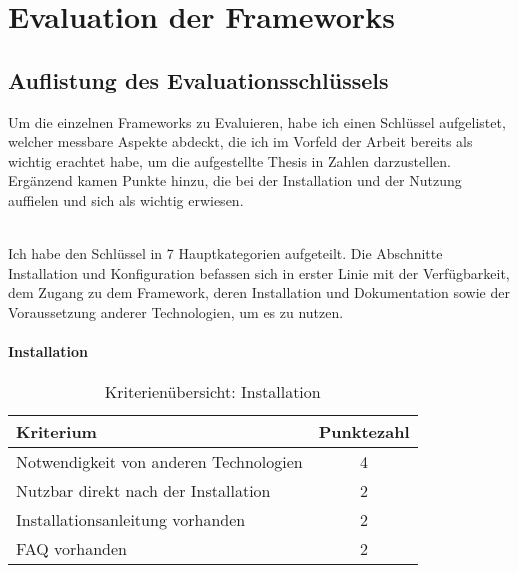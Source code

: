 \chapter{Evaluation der Frameworks}
\section{Auflistung des Evaluationsschlüssels}

Um die einzelnen Frameworks zu Evaluieren, habe ich einen Schlüssel aufgelistet, welcher messbare Aspekte abdeckt, die ich im Vorfeld der Arbeit bereits als wichtig erachtet habe, um die aufgestellte Thesis in Zahlen darzustellen. Ergänzend kamen Punkte hinzu, die bei der Installation und der Nutzung auffielen und sich als wichtig erwiesen. 

\\Ich habe den Schlüssel in 7 Hauptkategorien aufgeteilt. Die Abschnitte Installation und Konfiguration befassen sich in erster Linie mit der Verfügbarkeit, dem Zugang zu dem Framework, deren Installation und Dokumentation sowie der Voraussetzung anderer Technologien, um es zu nutzen.

\subsubsection{Installation}
\begin{table}[H]
 	\vspace{-30pt}
 	\centering
		\begin{tabular}{| p{12cm} | c|}
			\hline
				Kriterium		 &	Punktezahl\\
			\hline
			\hline
				Notwendigkeit von anderen Technologien				&4\\
				Nutzbar direkt nach der Installation			&	2	\\
				Installationsanleitung vorhanden			&	2	\\
				FAQ vorhanden				&	2	\\
				\hline
		\end{tabular}
	\caption{Kriterienübersicht: Installation}
\end{table}

